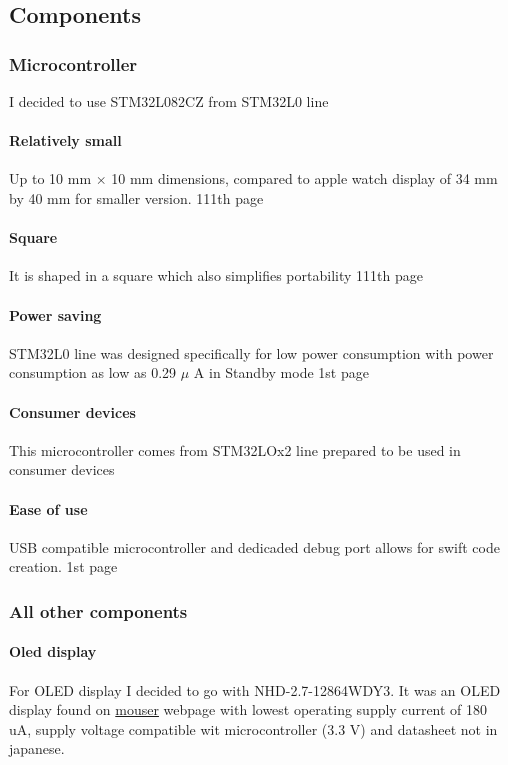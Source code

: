 \documentclass{article}
\begin{document}
\subsection{Components}
\subsubsection{Microcontroller}
I decided to use STM32L082CZ from STM32L0 line
\paragraph{Relatively small} Up to 10 mm $\times$ 10 mm dimensions, 
compared to apple watch display of 34 mm by 40 mm for smaller version. 
\cite{datasheet}
111th page
\paragraph{Square} It is shaped in a square which also simplifies portability
\cite{datasheet} 111th page
\paragraph{Power saving} STM32L0 line was designed specifically for low power
consumption with power consumption as low as 0.29 $\mu$ A in Standby mode
\cite{datasheet} 1st page
\paragraph{Consumer devices} This microcontroller comes from STM32LOx2 line
prepared to be used in consumer devices \cite{consumerDevice}
\paragraph{Ease of use} USB compatible microcontroller and dedicaded debug port
allows for swift code creation.
\cite{datasheet} 1st page 
\subsubsection{All other components}
\paragraph{Oled display} For OLED display I decided to go with
NHD-2.7-12864WDY3. It was an OLED display found on \href{www.mouser.pl}{mouser}
webpage with lowest operating supply current of 180 uA, supply voltage
compatible wit microcontroller (3.3 V) and datasheet not in japanese.
\cite{OLED}
\end{document}
